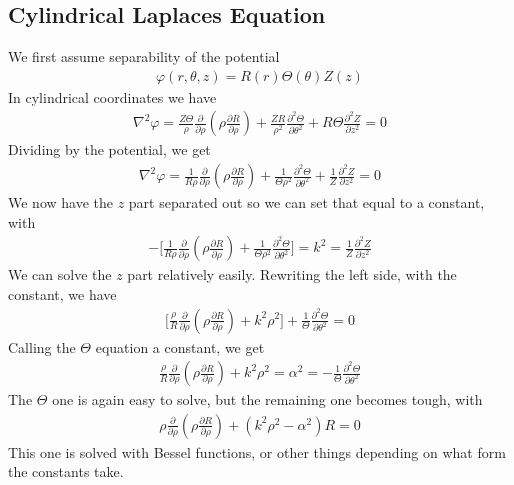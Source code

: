 \subsection{Cylindrical Laplaces Equation}\label{cylinderlaplacian}
We first assume separability of the potential
\begin{align}
\varphi(r,\theta,z) = R(r)\Theta(\theta)Z(z)
\end{align}
In cylindrical coordinates we have
\begin{align}
\nabla^2 \varphi = \frac{Z\Theta}{\rho}\frac{\partial}{\partial \rho}\left(\rho \frac{\partial R}{\partial \rho}\right)
+ \frac{ZR}{\rho^2}\frac{\partial^2 \Theta}{\partial \theta^2}
+ R\Theta \frac{\partial^2 Z}{\partial z^2}= 0
\end{align}
Dividing by the potential, we get
\begin{align}
\nabla^2 \varphi = \frac{1}{R\rho}\frac{\partial}{\partial \rho}\left(\rho \frac{\partial R}{\partial \rho}\right)
+ \frac{1}{\Theta\rho^2}\frac{\partial^2 \Theta}{\partial \theta^2}
+ \frac{1}{Z}\frac{\partial^2 Z}{\partial z^2}= 0
\end{align}
We now have the $z$ part separated out so we can set that equal to a constant, with
\begin{align}
- \Big[\frac{1}{R\rho}\frac{\partial}{\partial \rho}\left(\rho \frac{\partial R}{\partial \rho}\right)
+ \frac{1}{\Theta\rho^2}\frac{\partial^2 \Theta}{\partial \theta^2}\Big]
= k^2 = \frac{1}{Z}\frac{\partial^2 Z}{\partial z^2}
\end{align}
We can solve the $z$ part relatively easily. Rewriting the left side, with the constant, we have
\begin{align}
 \Big[\frac{\rho}{R}\frac{\partial}{\partial \rho}\left(\rho \frac{\partial R}{\partial \rho}\right)
 +k^2\rho^2\Big]
+ \frac{1}{\Theta}\frac{\partial^2 \Theta}{\partial \theta^2} = 0
\end{align}
Calling the $\Theta$ equation a constant, we get
\begin{align}
\frac{\rho}{R}\frac{\partial}{\partial \rho}\left(\rho \frac{\partial R}{\partial \rho}\right)
 +k^2\rho^2= \alpha^2 = -\frac{1}{\Theta}\frac{\partial^2 \Theta}{\partial \theta^2}
\end{align}
The $\Theta$ one is again easy to solve, but the remaining one becomes tough, with
\begin{align}
{\rho }\frac{\partial}{\partial \rho}\left(\rho \frac{\partial R}{\partial \rho}\right)
 +(k^2\rho^2-\alpha^2)R = 0
\end{align}
This one is solved with Bessel functions, or other things depending on what form  the constants take.







